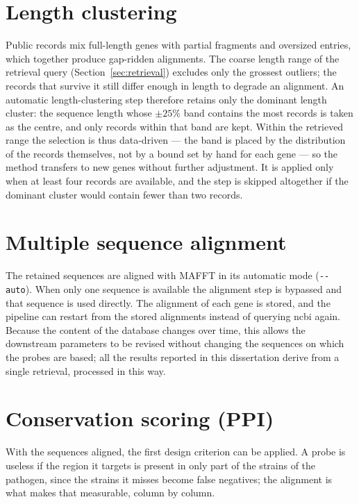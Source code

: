 \section{Length clustering}

Public records mix full-length genes with partial fragments and oversized entries, which together produce
gap-ridden alignments. The coarse length range of the retrieval query
(Section~\ref{sec:retrieval}) excludes only the grossest outliers; the records that survive it still
differ enough in length to degrade an alignment. An automatic length-clustering step therefore
retains only the dominant length cluster: the sequence length whose $\pm 25\%$ band contains the most
records is taken as the centre, and only records within that band are kept. Within the retrieved
range the selection is thus data-driven --- the band is placed by the distribution of the records
themselves, not by a bound set by hand for each gene --- so the method transfers to new genes without
further adjustment. It is applied only when at least four records are available, and the step is
skipped altogether if the dominant cluster would contain fewer than two records.

\section{Multiple sequence alignment}

The retained sequences are aligned with MAFFT in its automatic mode (\texttt{-{}-auto}). When only one
sequence is available the alignment step is bypassed and that sequence is used directly. The alignment of
each gene is stored, and the pipeline can restart from the stored alignments instead of querying
\acrshort{ncbi} again. Because the content of the database changes over time, this allows the downstream
parameters to be revised without changing the sequences on which the probes are based; all the results
reported in this dissertation derive from a single retrieval, processed in this way.

\section{Conservation scoring (PPI)}

With the sequences aligned, the first design criterion can be applied. A probe is useless if the
region it targets is present in only part of the strains of the pathogen, since the strains it
misses become false negatives; the alignment is what makes that measurable, column by column.

